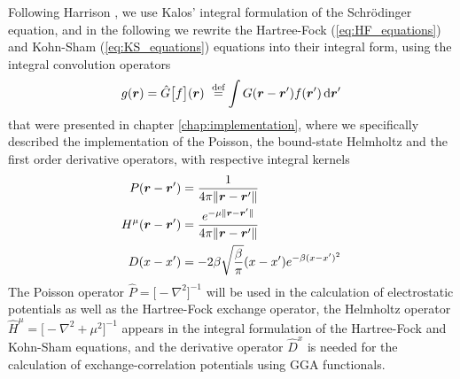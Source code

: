 Following Harrison \etal\cite{Harrison_basic:2004}, we use Kalos'\cite{Kalos:1962} integral 
formulation of the 
Schr\"{o}dinger equation, and in the following we rewrite the Hartree-Fock (\ref{eq:HF_equations}) 
and Kohn-Sham (\ref{eq:KS_equations}) equations into their integral form, using the integral 
convolution operators
\begin{equation}
    g(\bs{r}) = \hat{G}\big[f\big](\bs{r}) \mydef \int G(\bs{r}-\bs{r}') f(\bs{r}') \ud\bs{r}'
\end{equation}
that were presented in chapter \ref{chap:implementation}, where we specifically described
the implementation of the Poisson, the bound-state Helmholtz and the first order derivative 
operators, with respective integral kernels
\begin{align}
    P(\boldsymbol r-\boldsymbol r') &= \frac{1}{4\pi\|\boldsymbol r-\boldsymbol r'\|}\\
    H^\mu(\boldsymbol r-\boldsymbol r') &= \frac{e^{-\mu\|\boldsymbol r-\boldsymbol r'\|}}{4\pi\|\boldsymbol r-\boldsymbol r'\|}\\
    D(x-x') &= -2\beta \sqrt{\frac{\beta}{\pi}}(x-x')e^{-\beta (x-x')^2}
\end{align}
The Poisson operator $\hat{P}=\big[-\nabla^2\big]^{-1}$ will be used in the calculation of 
electrostatic potentials as well as the Hartree-Fock exchange operator, the Helmholtz 
operator $\hat{H}^\mu=\big[-\nabla^2+\mu^2\big]^{-1}$ appears in the integral formulation 
of the Hartree-Fock and Kohn-Sham equations, and the derivative operator $\hat{D}^x$ is 
needed for the calculation of exchange-correlation potentials using GGA functionals.

